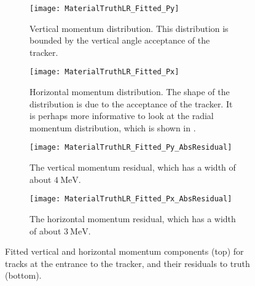     \begin{figure}
    \centering
        \begin{subfigure}[t]{0.45\textwidth}
            \centering
            \texttt{[image: MaterialTruthLR\_Fitted\_Py]}
            \caption{Vertical momentum distribution. This distribution is bounded by the vertical angle acceptance of the tracker.}
        \end{subfigure}
        \hspace{5mm}
        \begin{subfigure}[t]{0.45\textwidth}
            \centering
            \texttt{[image: MaterialTruthLR\_Fitted\_Px]}
            \caption{Horizontal momentum distribution. The shape of the distribution is due to the acceptance of the tracker. It is perhaps more informative to look at the radial momentum distribution, which is shown in .}
        \end{subfigure}
        \vspace{2mm}
        \begin{subfigure}[t]{0.45\textwidth}
            \centering
            \texttt{[image: MaterialTruthLR\_Fitted\_Py\_AbsResidual]}
            \caption{The vertical momentum residual, which has a width of about $\SI{4}{\MeV}$.}
        \end{subfigure}%
        \hspace{5mm}
        \begin{subfigure}[t]{0.45\textwidth}
            \centering
            \texttt{[image: MaterialTruthLR\_Fitted\_Px\_AbsResidual]}
            \caption{The horizontal momentum residual, which has a width of about $\SI{3}{\MeV}$.}
        \end{subfigure}%
    \caption[Fitted track vertical and horizontal momenta and corresponding residuals to truth]{Fitted vertical and horizontal momentum components (top) for tracks at the entrance to the tracker, and their residuals to truth (bottom).}
    \label{fig:MaterialFittedMomentaComponents}
    \end{figure}


